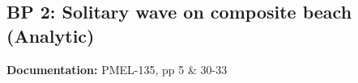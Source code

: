 \newsection

\subsection{BP 2:
 Solitary wave on composite beach (Analytic)}

{\bf Documentation:}  PMEL-135, pp 5 \& 30-33


